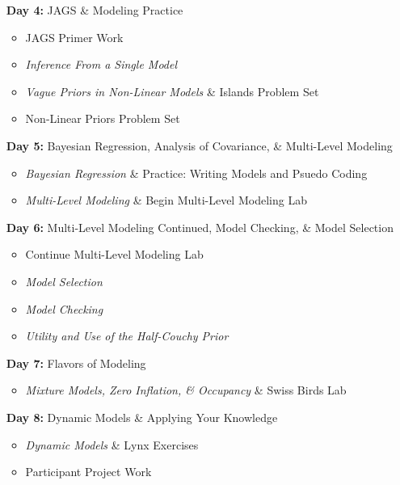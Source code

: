 \documentclass[11pt]{article}
\begin{document}
\begin{enumerate}
\item[\textbf{Day 4:}] JAGS \& Modeling Practice

\begin{itemize}
\item JAGS Primer Work
\item \emph{Inference From a Single Model} %
\item \emph{Vague Priors in Non-Linear Models} \& Islands Problem Set %
\item Non-Linear Priors Problem Set %
\end{itemize}

\item[\textbf{Day 5:}] Bayesian Regression, Analysis of Covariance, \& Multi-Level Modeling

\begin{itemize}
\item \emph{Bayesian Regression} \& Practice: Writing Models and Psuedo Coding %
\item \emph{Multi-Level Modeling} \& Begin Multi-Level Modeling Lab  %
\end{itemize}

\newpage

\item[\textbf{Day 6:}] Multi-Level Modeling Continued, Model Checking, \& Model Selection

\begin{itemize}
\item  Continue Multi-Level Modeling Lab  %
\item \emph{Model Selection} %
\item \emph{Model Checking} %
\item \emph{Utility and Use of the Half-Couchy Prior} %
\end{itemize}

\item[\textbf{Day 7:}] Flavors of Modeling

\begin{itemize}
\item \emph{Mixture Models, Zero Inflation, \& Occupancy} \& Swiss Birds Lab %
\end{itemize}

\item[\textbf{Day 8:}] Dynamic Models \& Applying Your Knowledge

\begin{itemize}
\item \emph{Dynamic Models} \& Lynx Exercises %
\item Participant Project Work
\end{itemize}


\end{enumerate}
\end{document}
